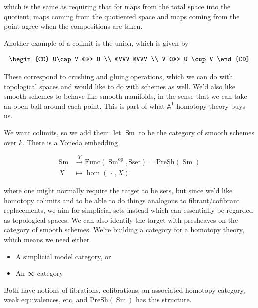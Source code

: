 which is the same as requiring that for maps from the total space into
the quotient, maps coming from the quotiented space and maps coming from
the point agree when the compositions are taken.

\begin{example}[?]

Another example of a colimit is the union, which is given by

\begin{align*}
\begin{CD}
  U\cap V @>>> U \\
  @VVV @VVV \\
  V @>>> U \cup V
\end{CD}
\end{align*}

These correspond to crushing and gluing operations, which we can do with
topological spaces and would like to do with schemes as well. We'd also
like smooth schemes to behave like smooth manifolds, in the sense that
we can take an open ball around each point. This is part of what
\({\mathbb{A}}^1\) homotopy theory buys us.

\end{example}

We want colimits, so we add them: let \({\operatorname{Sm}}\) to be the
category of smooth schemes over \(k\). There is a Yoneda embedding

\begin{align*} {\operatorname{Sm}}&\xrightarrow{Y} \mathrm{Func}({\operatorname{Sm}}^\text{op}, \mathrm{Sset}) = \text{PreSh}({\operatorname{Sm}}) \\ X &\mapsto \hom({\,\cdot\,}, X) .\end{align*}

where one might normally require the target to be sets, but since we'd
like homotopy colimits and to be able to do things analogous to
fibrant/cofibrant replacements, we aim for simplicial sets instead which
can essentially be regarded as topological spaces. We can also identify
the target with presheaves on the category of smooth schemes. We're
building a category for a homotopy theory, which means we need either

\begin{itemize}
\tightlist
\item
  A simplicial model category, or
\item
  An \(\infty{\hbox{-}}\)category
\end{itemize}

Both have notions of fibrations, cofibrations, an associated homotopy
category, weak equivalences, etc, and
\(\text{PreSh}({\operatorname{Sm}})\) has this structure.

